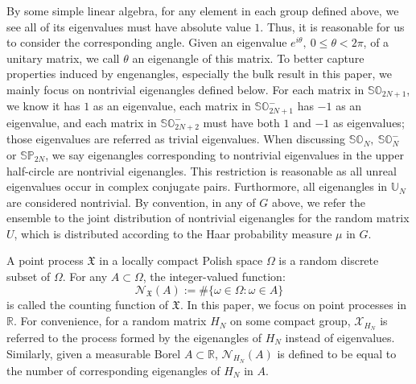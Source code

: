 \documentclass[11pt]{article}
\numberwithin{equation}{section}%
\numberwithin{theorem}{section}
\begin{document}
By some simple linear algebra, for any element in each group defined above, we see all of its eigenvalues must have absolute value $1$. Thus, it is reasonable for us to consider the corresponding angle. Given an eigenvalue $e^{i\theta},~0\le\theta<2\pi$, of a unitary matrix, we call $\theta$ an eigenangle of this matrix. To better capture properties induced by engenangles, especially the bulk result in this paper, we mainly focus on nontrivial eigenangles defined below. For each matrix in $\mathbb{SO}_{2N+1}$, we know it has $1$ as an eigenvalue, each matrix in $\mathbb{SO}^-_{2N+1}$ has $-1$ as an eigenvalue, and each matrix in $\mathbb{SO}^-_{2N+2}$ must have both $1$ and $-1$ as eigenvalues; those eigenvalues are referred as trivial eigenvalues.  When discussing $\mathbb{SO}_N,~\mathbb{SO}^-_N$ or $\mathbb{SP}_{2N}$, we say eigenangles corresponding to nontrivial eigenvalues in the upper half-circle are nontrivial eigenangles. This restriction is reasonable as all unreal eigenvalues occur in complex conjugate pairs. Furthormore, all eigenangles in $\mathbb{U}_N$ are considered nontrivial. By convention, in any of $G$ above, we refer the ensemble to the joint distribution of nontrivial eigenangles for the random matrix $U$, which is distributed according to the Haar probability measure $\mu$ in $G$.

A point process $\mathfrak{X}$ in a locally compact Polish space $\Omega$ is a random discrete subset of $\Omega$. For any $A\subset\Omega$, the integer-valued function:
\begin{equation*}
\mathcal{N}_\mathfrak{X}(A):=\#\{\omega\in\Omega:\omega\in A\}
\end{equation*}
is called the counting function of $\mathfrak{X}$. In this paper, we focus on point processes in $\mathbb{R}$. For convenience, for a random matrix $H_N$ on some compact group, $\mathcal{X}_{H_N}$ is referred to the process formed by the eigenangles of $H_N$ instead of eigenvalues. Similarly, given a measurable Borel $A\subset\mathbb{R}$, $\mathcal{N}_{H_N}(A)$ is defined to be equal to the number of corresponding eigenangles of $H_N$ in $A$. 
\end{document}

